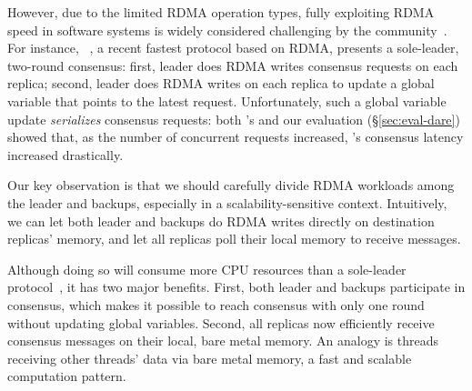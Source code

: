However, due to the limited RDMA operation types, fully exploiting RDMA
speed in software systems is widely considered 
challenging by the community~\cite{pilaf:usenix14,herd:sigcomm14,
farm:sosp15,dare:hpdc15}. For instance, \dare~\cite{dare:hpdc15}, a recent 
fastest \paxos protocol based on RDMA, presents a sole-leader, two-round 
consensus: first, leader does RDMA writes consensus requests on each replica; 
second, leader does RDMA writes on each replica to update a global variable 
that points to the latest request. Unfortunately, such a global variable update 
\emph{serializes} consensus requests: both \dare's and our 
evaluation (\S\ref{sec:eval-dare}) showed that, as the number of concurrent 
requests increased, \dare's consensus latency increased drastically.




Our key observation is that we should carefully divide RDMA workloads among
the leader and backups, especially in a scalability-sensitive context. 
Intuitively, we can let both leader and backups do RDMA writes directly on 
destination replicas' memory, and let all replicas poll their local memory to 
receive messages.

Although doing so will consume more CPU resources than a sole-leader 
protocol~\cite{dare:hpdc15}, it has two major benefits. First, both leader and 
backups participate in consensus, which makes it possible to reach consensus 
with only one round~\cite{paxos:practical} without updating global variables. 
Second, all replicas now efficiently receive consensus messages on their local, 
bare metal memory. An analogy is threads receiving other threads' data via bare 
metal memory, a fast and scalable computation pattern.


